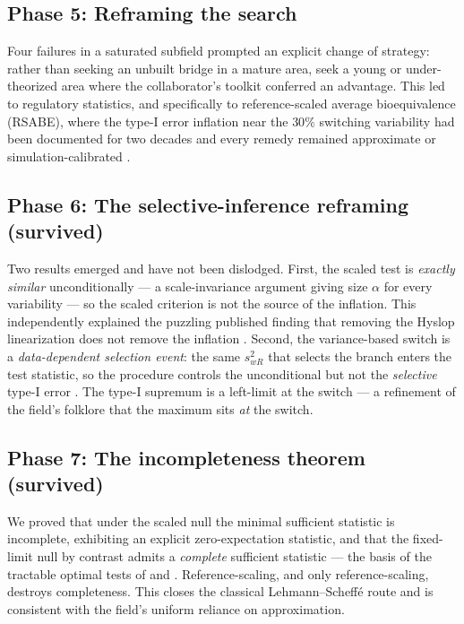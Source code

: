 \documentclass[11pt]{article}
\theoremstyle{remark}
\begin{document}
\subsection{Phase 5: Reframing the search}
Four failures in a saturated subfield prompted an explicit change of strategy: rather than seeking an unbuilt bridge in a mature area, seek a young or under-theorized area where the collaborator's toolkit conferred an advantage. This led to regulatory statistics, and specifically to reference-scaled average bioequivalence (RSABE), where the type-I error inflation near the $30\%$ switching variability had been documented for two decades \citep{labes2016, wonnemann2015} and every remedy remained approximate or simulation-calibrated \citep{tothfalusi2016, molins2017, ocana2019, munoz2024}.

\subsection{Phase 6: The selective-inference reframing (survived)}
Two results emerged and have not been dislodged. First, the scaled test is \emph{exactly similar} unconditionally --- a scale-invariance argument giving size $\alpha$ for every variability --- so the scaled criterion is not the source of the inflation. This independently explained the puzzling published finding that removing the Hyslop linearization does not remove the inflation \citep{tothfalusi2016}. Second, the variance-based switch is a \emph{data-dependent selection event}: the same $s^2_{wR}$ that selects the branch enters the test statistic, so the procedure controls the unconditional but not the \emph{selective} type-I error \citep{fithian2014, lee2016, taylor2015}. The type-I supremum is a left-limit at the switch --- a refinement of the field's folklore that the maximum sits \emph{at} the switch.

\subsection{Phase 7: The incompleteness theorem (survived)}
We proved that under the scaled null the minimal sufficient statistic is incomplete, exhibiting an explicit zero-expectation statistic, and that the fixed-limit null by contrast admits a \emph{complete} sufficient statistic --- the basis of the tractable optimal tests of \citet{bhm1997} and \citet{bergerhsu1996}. Reference-scaling, and only reference-scaling, destroys completeness. This closes the classical Lehmann--Scheff\'e route and is consistent with the field's uniform reliance on approximation.
\end{document}
